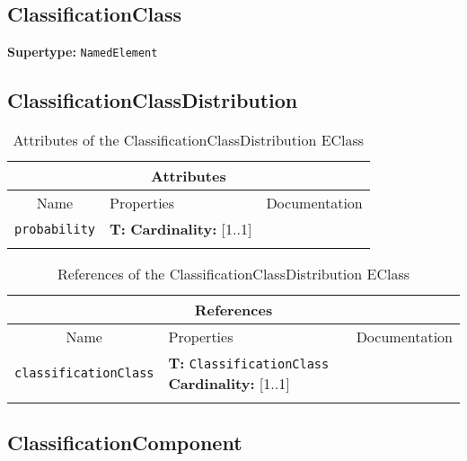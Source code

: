 \documentclass{article}
\begin{document}
\subsection[ClassificationClass]{ClassificationClass}
\label{e4smClassificationClass}

\textbf{Supertype: }\texttt{NamedElement}
\subsection[ClassificationClassDistribution]{ClassificationClassDistribution}
\label{e4smClassificationClassDistribution}

\begin{table}[H]
\footnotesize
\begin{tabularx}{\textwidth}{|c| p{4 cm} | X |}
\hline
\multicolumn{3}{|c|}{\textbf{Attributes}} \\
\hline
Name & Properties & Documentation \\ \hline \hline
\texttt{probability}
 & 
\textbf{T:} \texttt{}
\newline
\textbf{Cardinality:} [1..1]
 & \\ \hline
\caption{Attributes of the ClassificationClassDistribution EClass}
\end{tabularx}
\label{e4smClassificationClassDistributionattr}
\end{table}
\begin{table}[H]
\footnotesize
\begin{tabularx}{\textwidth}{|c| p{4 cm} | X |}
\hline
\multicolumn{3}{|c|}{\textbf{References}} \\
\hline
Name & Properties & Documentation \\ \hline \hline
\texttt{classificationClass}
 & 
\textbf{T:} \texttt{ClassificationClass}
\newline
\textbf{Cardinality:} [1..1]
 & \\ \hline
\caption{References of the ClassificationClassDistribution EClass}
\end{tabularx}
\label{e4smClassificationClassDistributionref}
\end{table}
\subsection[ClassificationComponent]{ClassificationComponent}
\label{e4smClassificationComponent}
\end{document}
